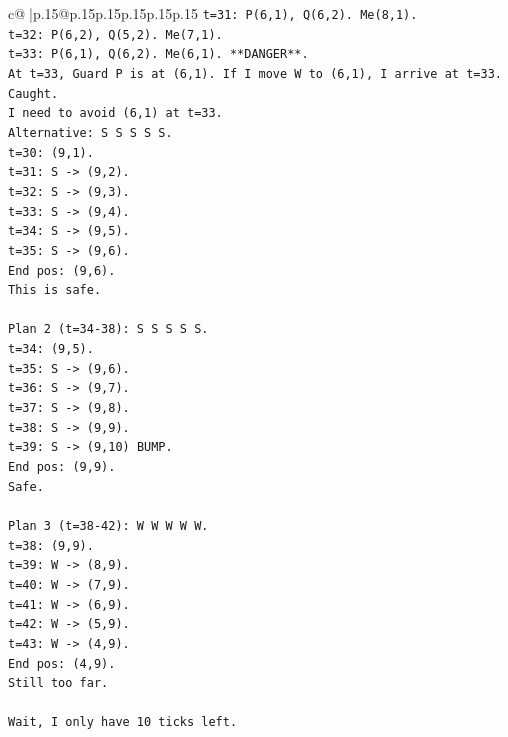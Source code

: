 \documentclass{article}
\begin{document}
{\begin{supertabular}{c@{$\;$}|p{.15\linewidth}@{}p{.15\linewidth}p{.15\linewidth}p{.15\linewidth}p{.15\linewidth}p{.15\linewidth}}
{{{\texttt{t=31: P(6,1), Q(6,2). Me(8,1).} \\
\texttt{t=32: P(6,2), Q(5,2). Me(7,1).} \\
\texttt{t=33: P(6,1), Q(6,2). Me(6,1). **DANGER**.} \\
\texttt{At t=33, Guard P is at (6,1). If I move W to (6,1), I arrive at t=33. Caught.} \\
\texttt{I need to avoid (6,1) at t=33.} \\
\texttt{Alternative: S S S S S.} \\
\texttt{t=30: (9,1).} \\
\texttt{t=31: S {-}> (9,2).} \\
\texttt{t=32: S {-}> (9,3).} \\
\texttt{t=33: S {-}> (9,4).} \\
\texttt{t=34: S {-}> (9,5).} \\
\texttt{t=35: S {-}> (9,6).} \\
\texttt{End pos: (9,6).} \\
\texttt{This is safe.} \\
\\ 
\texttt{Plan 2 (t=34{-}38): S S S S S.} \\
\texttt{t=34: (9,5).} \\
\texttt{t=35: S {-}> (9,6).} \\
\texttt{t=36: S {-}> (9,7).} \\
\texttt{t=37: S {-}> (9,8).} \\
\texttt{t=38: S {-}> (9,9).} \\
\texttt{t=39: S {-}> (9,10) BUMP.} \\
\texttt{End pos: (9,9).} \\
\texttt{Safe.} \\
\\ 
\texttt{Plan 3 (t=38{-}42): W W W W W.} \\
\texttt{t=38: (9,9).} \\
\texttt{t=39: W {-}> (8,9).} \\
\texttt{t=40: W {-}> (7,9).} \\
\texttt{t=41: W {-}> (6,9).} \\
\texttt{t=42: W {-}> (5,9).} \\
\texttt{t=43: W {-}> (4,9).} \\
\texttt{End pos: (4,9).} \\
\texttt{Still too far.} \\
\\ 
\texttt{Wait, I only have 10 ticks left.} \\
}}}
\end{supertabular}}
\end{document}

